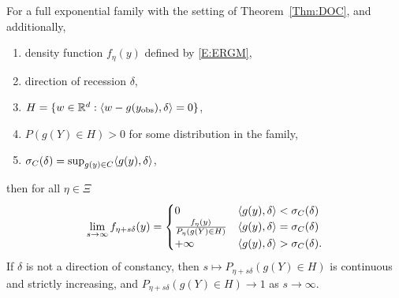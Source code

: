 \begin{theorem} \label{Thm:LCM}
For a full exponential family with the setting of Theorem~\ref{Thm:DOC}, and 
additionally,
\begin{enumerate}
\item density function $f_{\eta}(y)$ defined by \eqref{E:ERGM},
\item direction of recession $\delta$,
\item $H = \{ w \in {\mathbb R}^d: \langle  w-g(y_{\text{obs}}), \delta  \rangle = 0 \}$,
\item $P( g(Y) \in H) > 0$ for some distribution in the family,
\item $\sigma_C (\delta) = \sup_{g(y) \in C} \langle  g(y), \delta \rangle$,
\end{enumerate}
then for all $\eta \in \Xi$
\begin{align} \label{E:LCM}
\lim_{s \to \infty} f_{\eta+s\delta}(y) = 
			\begin{cases} 
		0 								
			& \langle g(y), \delta \rangle < \sigma_C(\delta) \\
		\frac{f_\eta(y)}{P_\eta(g(Y) \in H)} 	
			& \langle g(y),\delta \rangle =  \sigma_C(\delta)\\
		+\infty							
			& \langle g(y), \delta \rangle > \sigma_C(\delta).
		\end{cases}
\end{align}
If $\delta$ is not a direction of constancy, 
then $s \mapsto P_{\eta+s\delta}( g(Y) \in H)$ is continuous and 
strictly increasing, and $P_{\eta+s\delta}( g(Y) \in H) \to 1$ as $s \to \infty$.
\end{theorem}



